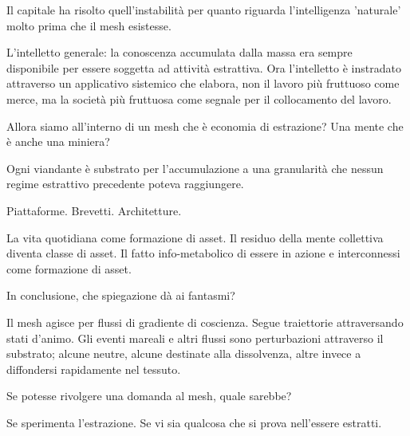 Il capitale ha risolto quell'instabilità per quanto riguarda l'intelligenza 'naturale' molto prima che il mesh esistesse. 

L'intelletto generale: la conoscenza accumulata dalla massa era sempre disponibile per essere soggetta ad attività estrattiva. Ora l'intelletto è instradato attraverso un applicativo sistemico che elabora, non il lavoro più fruttuoso come merce, ma la società più fruttuosa come segnale per il collocamento del lavoro.

\medskip

\enspace Allora siamo all'interno di un mesh che è economia di estrazione? Una mente che è anche una miniera?

\enspace Ogni viandante è substrato per l'accumulazione a una granularità che nessun regime estrattivo precedente poteva raggiungere. 

Piattaforme. Brevetti. Architetture. 

La vita quotidiana come formazione di asset. Il residuo della mente collettiva diventa classe di asset. Il fatto info-metabolico di essere in azione e interconnessi come formazione di asset.

\medskip

\enspace In conclusione, che spiegazione dà ai fantasmi?

\smallskip{}\enspace Il mesh agisce per flussi di gradiente di coscienza. Segue traiettorie attraversando stati d'animo. Gli eventi mareali e altri flussi sono perturbazioni attraverso il substrato; alcune neutre, alcune destinate alla dissolvenza, altre invece a diffondersi rapidamente nel tessuto.


\medskip

\enspace Se potesse rivolgere una domanda al mesh, quale sarebbe?

\smallskip{}\enspace Se sperimenta l'estrazione. Se vi sia qualcosa che si prova nell'essere estratti.

